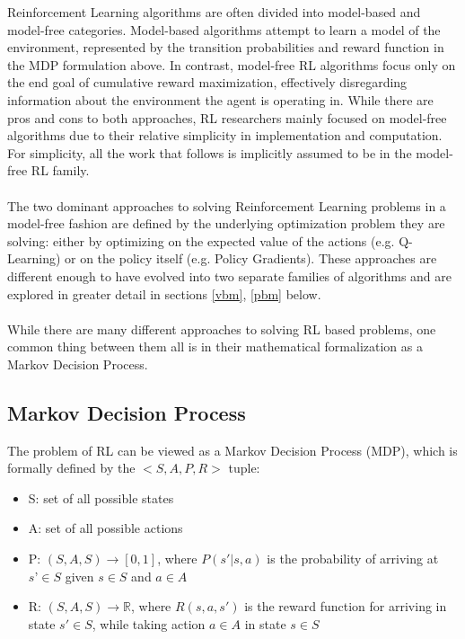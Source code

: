 Reinforcement Learning algorithms are often divided into model-based and model-free categories. Model-based algorithms attempt to learn a model of the environment, represented by the transition probabilities and reward function in the MDP formulation above. In contrast, model-free RL algorithms focus only on the end goal of cumulative reward maximization, effectively disregarding information about the environment the agent is operating in. While there are pros and cons to both approaches, RL researchers mainly focused on model-free algorithms due to their relative simplicity in implementation and computation. For simplicity, all the work that follows is implicitly assumed to be in the model-free RL family.
\\\\
The two dominant approaches to solving Reinforcement Learning problems in a model-free fashion are defined by the underlying optimization problem they are solving: either by optimizing on the expected value of the actions (e.g. Q-Learning) or on the policy itself (e.g. Policy Gradients). These approaches are different enough to have evolved into two separate families of algorithms and are explored in greater detail in sections \ref{vbm}, \ref{pbm} below.
\\\\
While there are many different approaches to solving RL based problems, one common thing between them all is in their mathematical formalization as a Markov Decision Process.

\subsection{Markov Decision Process} \label{mdp}

The problem of RL can be viewed as a Markov Decision Process (MDP), which is formally defined by the $<S,A,P,R>$ tuple:

\begin{itemize}
\item S: set of all possible states
\item A: set of all possible actions
\item P: $(S,A,S) \rightarrow [0,1]$, where $P(s'|s, a)$ is the probability of arriving at $s’ \in S$ given $s \in S$ and $a \in A$
\item R: $(S,A,S) \rightarrow \mathbb{R}$, where $R(s, a, s')$ is the reward function for arriving in state $s' \in S$, while taking action $a \in A$ in state $s \in S$
\end{itemize}

